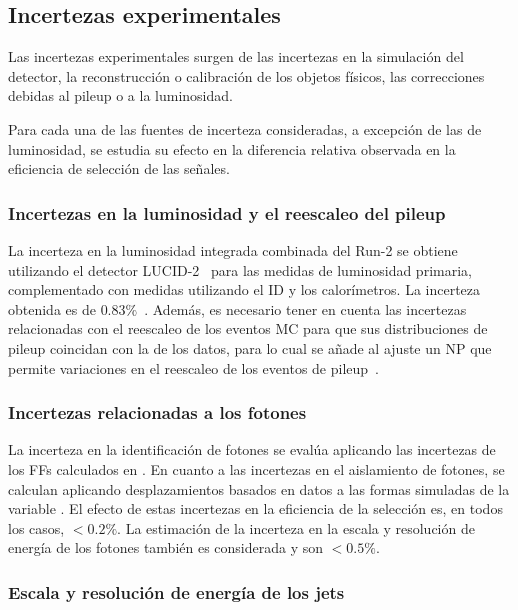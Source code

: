 \subsection{Incertezas experimentales}
\label{subsec:signals:systs:exp}

Las incertezas experimentales surgen de las incertezas en la simulación del detector, la reconstrucción o calibración de los objetos físicos, las correcciones debidas al pileup o a la luminosidad.

Para cada una de las fuentes de incerteza consideradas, a excepción de las de luminosidad, se estudia su efecto en la diferencia relativa observada en la eficiencia de selección de las señales.



\subsubsection{Incertezas en la luminosidad y el reescaleo del pileup}
La incerteza en la luminosidad integrada combinada del Run-2 se obtiene utilizando el detector LUCID-2~\cite{ATLAS-LUCID2} para las medidas de luminosidad primaria, complementado con medidas utilizando el \ac{ID} y los calorímetros. La incerteza obtenida es de \(0.83\%\)~\cite{ATLAS-Lumi-Run2}.
Además, es necesario tener en cuenta las incertezas relacionadas con el reescaleo de los eventos \ac{MC} para que sus distribuciones de pileup coincidan con la de los datos, para lo cual se añade al ajuste un \ac{NP} que permite variaciones en el reescaleo de los eventos de pileup~\cite{ATLAS-PileupRW}.


\subsubsection{Incertezas relacionadas a los fotones}
La incerteza en la identificación de fotones se evalúa aplicando las incertezas de los \acp{FF} calculados en \Ch{\ref{ch:ss_corrections}}.
En cuanto a las incertezas en el aislamiento de fotones, se calculan aplicando desplazamientos basados en datos a las formas simuladas de la variable \etiso. El efecto de estas incertezas en la eficiencia de la selección es, en todos los casos, \(<0.2\%\).
La estimación de la incerteza en la escala y resolución de energía de los fotones también es considerada y son \(<0.5\%\).


\subsubsection{Escala y resolución de energía de los jets}

